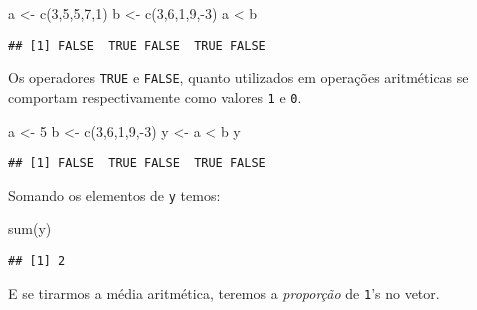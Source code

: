 \documentclass[
]{book}
\newenvironment{Shaded}{\begin{snugshade}}{\end{snugshade}}
\newcommand{\DecValTok}[1]{\textcolor[rgb]{0.00,0.00,0.81}{#1}}
\newcommand{\FunctionTok}[1]{\textcolor[rgb]{0.00,0.00,0.00}{#1}}
\newcommand{\NormalTok}[1]{#1}
\newcommand{\OtherTok}[1]{\textcolor[rgb]{0.56,0.35,0.01}{#1}}
\newcommand{\SpecialCharTok}[1]{\textcolor[rgb]{0.00,0.00,0.00}{#1}}
\begin{document}
\begin{Shaded}
\begin{Highlighting}[]
\NormalTok{a }\OtherTok{\textless{}{-}} \FunctionTok{c}\NormalTok{(}\DecValTok{3}\NormalTok{,}\DecValTok{5}\NormalTok{,}\DecValTok{5}\NormalTok{,}\DecValTok{7}\NormalTok{,}\DecValTok{1}\NormalTok{)}
\NormalTok{b }\OtherTok{\textless{}{-}} \FunctionTok{c}\NormalTok{(}\DecValTok{3}\NormalTok{,}\DecValTok{6}\NormalTok{,}\DecValTok{1}\NormalTok{,}\DecValTok{9}\NormalTok{,}\SpecialCharTok{{-}}\DecValTok{3}\NormalTok{)}
\NormalTok{a }\SpecialCharTok{\textless{}}\NormalTok{ b}
\end{Highlighting}
\end{Shaded}

\begin{verbatim}
## [1] FALSE  TRUE FALSE  TRUE FALSE
\end{verbatim}

Os operadores \texttt{TRUE} e \texttt{FALSE}, quanto utilizados em operações aritméticas se comportam respectivamente como valores \texttt{1} e \texttt{0}.

\begin{Shaded}
\begin{Highlighting}[]
\NormalTok{a }\OtherTok{\textless{}{-}} \DecValTok{5}
\NormalTok{b }\OtherTok{\textless{}{-}} \FunctionTok{c}\NormalTok{(}\DecValTok{3}\NormalTok{,}\DecValTok{6}\NormalTok{,}\DecValTok{1}\NormalTok{,}\DecValTok{9}\NormalTok{,}\SpecialCharTok{{-}}\DecValTok{3}\NormalTok{)}
\NormalTok{y }\OtherTok{\textless{}{-}}\NormalTok{ a }\SpecialCharTok{\textless{}}\NormalTok{ b}
\NormalTok{y}
\end{Highlighting}
\end{Shaded}

\begin{verbatim}
## [1] FALSE  TRUE FALSE  TRUE FALSE
\end{verbatim}

Somando os elementos de \texttt{y} temos:

\begin{Shaded}
\begin{Highlighting}[]
\FunctionTok{sum}\NormalTok{(y)}
\end{Highlighting}
\end{Shaded}

\begin{verbatim}
## [1] 2
\end{verbatim}

E se tirarmos a média aritmética, teremos a \emph{proporção} de \texttt{1}'s no vetor.
\end{document}
